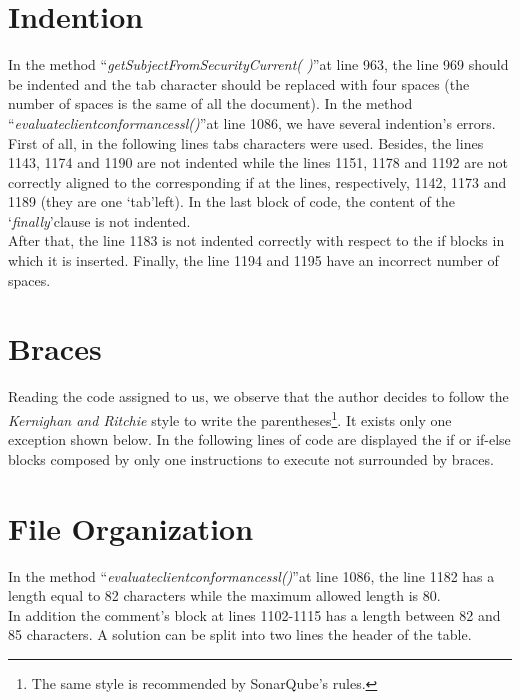 \documentclass[\mainpath/main]{subfiles}
\begin{document}
\section{Indention}
\label{CodeInspectionChecklist:Indention}
In the method \textquotedblleft \textit{getSubjectFromSecurityCurrent( )}\textquotedblright at line 963, the line 969 should be indented and the tab character should be replaced with four spaces (the number of spaces is the same of all the document).
In the method \textquotedblleft \textit{evaluate\textunderscore client\textunderscore conformance\textunderscore ssl(\textellipsis)}\textquotedblright at line 1086, we have several indention's errors.\\
First of all, in the following lines tabs characters were used.
Besides, the lines 1143, 1174 and 1190 are not indented while the lines 1151, 1178 and 1192 are not correctly aligned to the corresponding if at the lines, respectively, 1142, 1173 and 1189 (they are one \textquoteleft tab\textquoteright left).
In the last block of code, the content of the \textquoteleft \textit{finally}\textquoteright clause is not indented.\\
After that, the line 1183 is not indented correctly with respect to the if blocks in which it is inserted.
Finally, the line 1194 and 1195 have an incorrect number of spaces.

\section{Braces}
\label{CodeInspectionChecklist:Braces}
Reading the code assigned to us, we observe that the author decides to follow the \textit{Kernighan and Ritchie} style to write the parentheses\footnote{The same style is recommended by SonarQube's rules.}. It exists only one exception shown below.
In the following lines of code are displayed the if or if-else blocks composed by only one instructions to execute not surrounded by braces.

\section{File Organization}
\label{CodeInspectionChecklist:FileOrganization}
In the method \textquotedblleft \textit{evaluate\textunderscore client\textunderscore conformance\textunderscore ssl(\textellipsis)}\textquotedblright at line 1086, the line 1182 has a length equal to 82 characters while the maximum allowed length is 80.\\
In addition the comment's block at lines 1102-1115 has a length between 82 and 85 characters. A solution can be split into two lines the header of the table.
\end{document}
